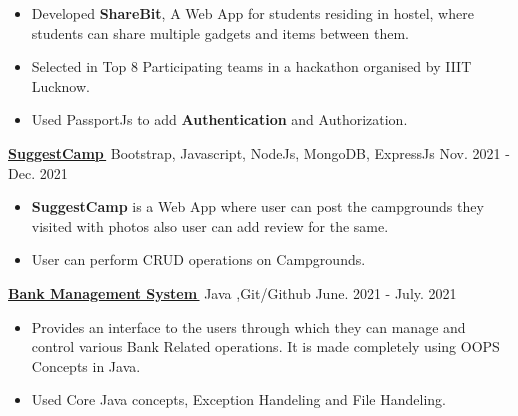 \documentclass[letterpaper,11pt]{article}
\let\orighref\href
\renewcommand{\href}[2]{\orighref{#1}{#2\,\faExternalLink}}
\begin{document}
{{{    \smallskip
    \begin{itemize}[noitemsep]
    
        \item Developed {\textbf{ShareBit}}, A Web App for students residing in hostel, where students can share multiple gadgets and items between them.
        \item Selected in Top 8 Participating teams in a hackathon organised by IIIT Lucknow.
        \item Used PassportJs to add {\textbf{Authentication}} and  Authorization. 
       
        
    \end{itemize}
\smallskip
\vspace{5}
    
  


  {  \textbf{\href{https://github.com/shankar9834/SuggestCamp}{SuggestCamp}}  \mid Bootstrap, Javascript, NodeJs, MongoDB, ExpressJs \hfill {Nov. 2021 - Dec. 2021}}\\
  
  \smallskip
   
    \begin{itemize}[noitemsep]
    
        \item {\textbf{SuggestCamp}} is a Web App where user can post the campgrounds they visited with photos also user can add review for the same.
        \item User can perform CRUD operations on Campgrounds. 
         
    \end{itemize}
     \smallskip
 \vspace{5}
  { \textbf{\href{https://github.com/shankar9834/BankManagementSystem}{Bank Management System}}  \mid Java ,Git/Github \hfill {June. 2021 - July. 2021}}\\
  
   
    \smallskip
    \begin{itemize}[noitemsep]
    
        \item Provides an interface to the users through which they can manage and control various Bank Related operations. It is made
completely using OOPS Concepts in Java.
        \item Used Core Java concepts, Exception Handeling and File Handeling.
         
    \end{itemize}
    \smallskip
    \vspace{5}
   

}}}
\end{document}
